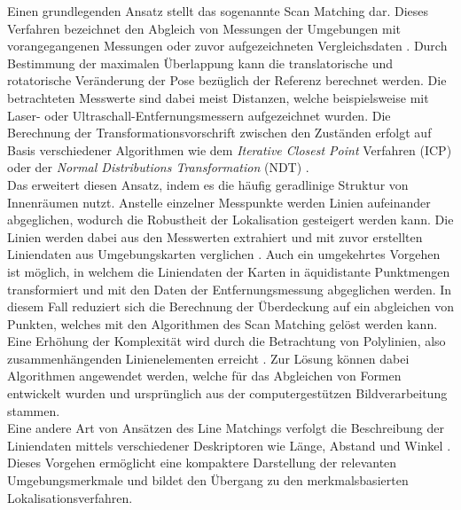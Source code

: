 Einen  grundlegenden Ansatz stellt das sogenannte Scan Matching  dar. Dieses Verfahren bezeichnet den Abgleich \red[(Matching)] von Messungen der Umgebungen mit vorangegangenen Messungen \cite{Gutmann1996} oder zuvor aufgezeichneten Vergleichsdaten \cite{Gutmann1998}. Durch Bestimmung der maximalen Überlappung kann die translatorische und rotatorische Veränderung der Pose bezüglich der Referenz berechnet werden. Die betrachteten Messwerte sind dabei meist Distanzen, welche beispielsweise mit Laser- \cite{Diosi2007} oder Ultraschall-Entfernungsmessern \cite{Burguera2005} aufgezeichnet wurden. Die Berechnung der Transformationsvorschrift zwischen den Zuständen erfolgt auf Basis verschiedener Algorithmen wie dem \textit{Iterative Closest Point} Verfahren (ICP) \cite{Besl1992}\cite{Lu1994} oder der \textit{Normal Distributions Transformation} (NDT) \cite{Biber2003}.\\

Das  erweitert diesen Ansatz, indem es die häufig geradlinige Struktur von Innenräumen nutzt. Anstelle einzelner Messpunkte werden Linien aufeinander abgeglichen, wodurch die Robustheit der Lokalisation gesteigert werden kann. Die Linien werden dabei aus den Messwerten extrahiert und mit zuvor erstellten Liniendaten aus Umgebungskarten verglichen \cite{Cox1991}\cite{Gutmann1999}. Auch ein umgekehrtes Vorgehen ist möglich, in welchem die Liniendaten der Karten in äquidistante Punktmengen transformiert und mit den Daten der Entfernungsmessung abgeglichen werden. In diesem Fall reduziert sich die Berechnung der Überdeckung auf ein abgleichen von Punkten, welches mit den Algorithmen des Scan Matching gelöst werden kann.\\
Eine Erhöhung der Komplexität wird durch die Betrachtung von Polylinien, also zusammenhängenden Linienelementen erreicht \cite{Wolter2004}. Zur Lösung können dabei Algorithmen angewendet werden, welche für das Abgleichen von Formen entwickelt wurden und ursprünglich aus der computergestützen Bildverarbeitung stammen.\\
Eine andere Art von Ansätzen des Line Matchings verfolgt die Beschreibung der Liniendaten mittels verschiedener Deskriptoren wie Länge, Abstand und Winkel \cite{Frey2014} \cite{Garulli2005}. Dieses Vorgehen ermöglicht eine kompaktere Darstellung der relevanten Umgebungsmerkmale und bildet den Übergang zu den merkmalsbasierten Lokalisationsverfahren.\\

